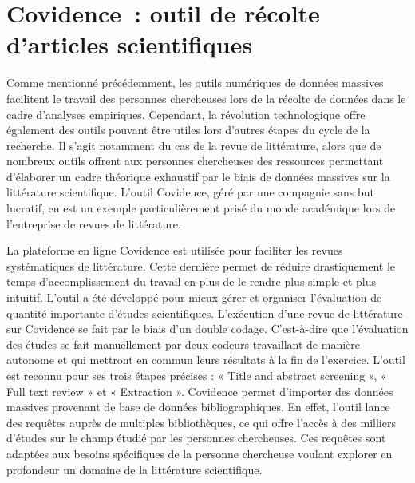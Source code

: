 \documentclass[
  letterpaper,
]{scrbook}
\begin{document}
\hypertarget{covidence-outil-de-ruxe9colte-darticles-scientifiques}{%
\section{\texorpdfstring{\textbf{Covidence~: outil de récolte d'articles
scientifiques}}{Covidence~: outil de récolte d'articles scientifiques}}\label{covidence-outil-de-ruxe9colte-darticles-scientifiques}}

Comme mentionné précédemment, les outils numériques de données massives
facilitent le travail des personnes chercheuses lors de la récolte de
données dans le cadre d'analyses empiriques. Cependant, la révolution
technologique offre également des outils pouvant être utiles lors
d'autres étapes du cycle de la recherche. Il s'agit notamment du cas de
la revue de littérature, alors que de nombreux outils offrent aux
personnes chercheuses des ressources permettant d'élaborer un cadre
théorique exhaustif par le biais de données massives sur la littérature
scientifique. L'outil Covidence, géré par une compagnie sans but
lucratif, en est un exemple particulièrement prisé du monde académique
lors de l'entreprise de revues de littérature.

La plateforme en ligne Covidence est utilisée pour faciliter les revues
systématiques de littérature. Cette dernière permet de réduire
drastiquement le temps d'accomplissement du travail en plus de le rendre
plus simple et plus intuitif. L'outil a été développé pour mieux gérer
et organiser l'évaluation de quantité importante d'études scientifiques.
L'exécution d'une revue de littérature sur Covidence se fait par le
biais d'un double codage. C'est-à-dire que l'évaluation des études se
fait manuellement par deux codeurs travaillant de manière autonome et
qui mettront en commun leurs résultats à la fin de l'exercice. L'outil
est reconnu pour ses trois étapes précises : « Title and abstract
screening », « Full text review » et « Extraction ». Covidence permet
d'importer des données massives provenant de base de données
bibliographiques. En effet, l'outil lance des requêtes auprès de
multiples bibliothèques, ce qui offre l'accès à des milliers d'études
sur le champ étudié par les personnes chercheuses. Ces requêtes sont
adaptées aux besoins spécifiques de la personne chercheuse voulant
explorer en profondeur un domaine de la littérature scientifique.
\end{document}
